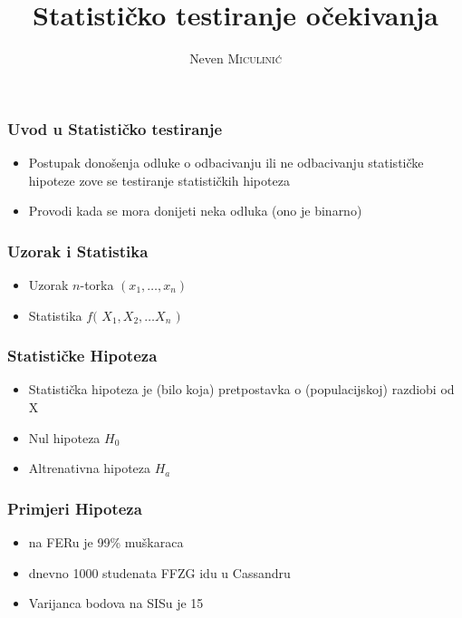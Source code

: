 \documentclass{beamer}
\title{Statističko testiranje očekivanja}
\author{Neven \textsc{Miculinić}}
\institute[FER] %
{
Fakultet Elektrotehnike i Računarstva \\ %
\medskip
\textit{neven.miculinic@fer.hr} %
}
\date{}
\begin{document}
\frame{\titlepage}

\begin{frame}
	\frametitle{Uvod u Statističko testiranje}
	\begin{itemize}[<+->]
		\item Postupak donošenja odluke o odbacivanju ili ne odbacivanju statističke hipoteze zove se testiranje statističkih hipoteza 
		\item Provodi kada se mora donijeti neka odluka (ono je binarno)
	\end{itemize}
\end{frame}

\begin{frame}
	\frametitle{Uzorak i Statistika}
	\begin{itemize}[<+->]
		\item Uzorak $n$-torka $(x_1, \ldots, x_n)$
		\item Statistika $f($ $X_1 , X_2 , \ldots X_n$ $)$
	\end{itemize}
\end{frame}

\begin{frame}
	\frametitle{Statističke Hipoteza}
	\begin{itemize}[<+->]
		\item Statistička hipoteza je (bilo koja) pretpostavka o
		(populacijskoj) razdiobi od X 
		\item Nul hipoteza $H_0$
		\item Altrenativna hipoteza $H_a$
	\end{itemize}
\end{frame}

\begin{frame}
	\frametitle{Primjeri Hipoteza}
	\begin{itemize}[<+->]
		\item na FERu je 99\% muškaraca
		\item dnevno 1000 studenata FFZG idu u Cassandru
		\item Varijanca bodova na SISu je 15
	\end{itemize}
\end{frame}
\end{document}
